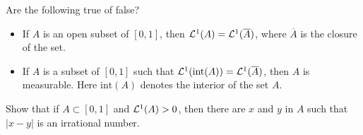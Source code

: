 \begin{problem}
    Are the following true of false?
    \begin{itemize}
        \item If $A$ is an open subset of $[0, 1]$, then $\mathcal L^1(A) = \mathcal L^1(\overline{A})$, where $\overline{A}$ is the closure of the set.
        \item If $A$ is a subset of $[0, 1]$ such that $\mathcal L^1(\mathrm{int}(A)) = \mathcal L^1(\overline{A})$, then $A$ is measurable. Here $\mathrm{int}(A)$ denotes the interior of the set $A$.
    \end{itemize}
\end{problem}

\begin{problem}
Show that if $A \subset [0, 1]$ and $\mathcal L^1(A) > 0$, then there are $x$ and $y$
in $A$ such that $|x - y|$ is an irrational number.
\end{problem}
